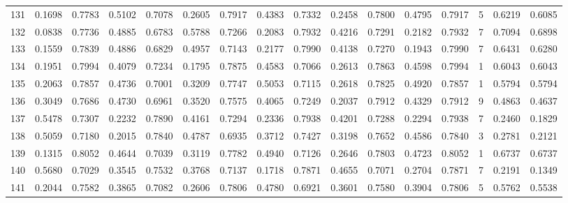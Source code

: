 \begin{tabular}{lrrrrrrrrrrrrrrr}
131 &      0.1698 &  0.7783 &  0.5102 &  0.7078 &  0.2605 &  0.7917 &  0.4383 &  0.7332 &  0.2458 &  0.7800 &   0.4795 &     0.7917 &      5 &                    0.6219 &                     0.6085 \\
132 &      0.0838 &  0.7736 &  0.4885 &  0.6783 &  0.5788 &  0.7266 &  0.2083 &  0.7932 &  0.4216 &  0.7291 &   0.2182 &     0.7932 &      7 &                    0.7094 &                     0.6898 \\
133 &      0.1559 &  0.7839 &  0.4886 &  0.6829 &  0.4957 &  0.7143 &  0.2177 &  0.7990 &  0.4138 &  0.7270 &   0.1943 &     0.7990 &      7 &                    0.6431 &                     0.6280 \\
134 &      0.1951 &  0.7994 &  0.4079 &  0.7234 &  0.1795 &  0.7875 &  0.4583 &  0.7066 &  0.2613 &  0.7863 &   0.4598 &     0.7994 &      1 &                    0.6043 &                     0.6043 \\
135 &      0.2063 &  0.7857 &  0.4736 &  0.7001 &  0.3209 &  0.7747 &  0.5053 &  0.7115 &  0.2618 &  0.7825 &   0.4920 &     0.7857 &      1 &                    0.5794 &                     0.5794 \\
136 &      0.3049 &  0.7686 &  0.4730 &  0.6961 &  0.3520 &  0.7575 &  0.4065 &  0.7249 &  0.2037 &  0.7912 &   0.4329 &     0.7912 &      9 &                    0.4863 &                     0.4637 \\
137 &      0.5478 &  0.7307 &  0.2232 &  0.7890 &  0.4161 &  0.7294 &  0.2336 &  0.7938 &  0.4201 &  0.7288 &   0.2294 &     0.7938 &      7 &                    0.2460 &                     0.1829 \\
138 &      0.5059 &  0.7180 &  0.2015 &  0.7840 &  0.4787 &  0.6935 &  0.3712 &  0.7427 &  0.3198 &  0.7652 &   0.4586 &     0.7840 &      3 &                    0.2781 &                     0.2121 \\
139 &      0.1315 &  0.8052 &  0.4644 &  0.7039 &  0.3119 &  0.7782 &  0.4940 &  0.7126 &  0.2646 &  0.7803 &   0.4723 &     0.8052 &      1 &                    0.6737 &                     0.6737 \\
140 &      0.5680 &  0.7029 &  0.3545 &  0.7532 &  0.3768 &  0.7137 &  0.1718 &  0.7871 &  0.4655 &  0.7071 &   0.2704 &     0.7871 &      7 &                    0.2191 &                     0.1349 \\
141 &      0.2044 &  0.7582 &  0.3865 &  0.7082 &  0.2606 &  0.7806 &  0.4780 &  0.6921 &  0.3601 &  0.7580 &   0.3904 &     0.7806 &      5 &                    0.5762 &                     0.5538 \\

\end{tabular}
